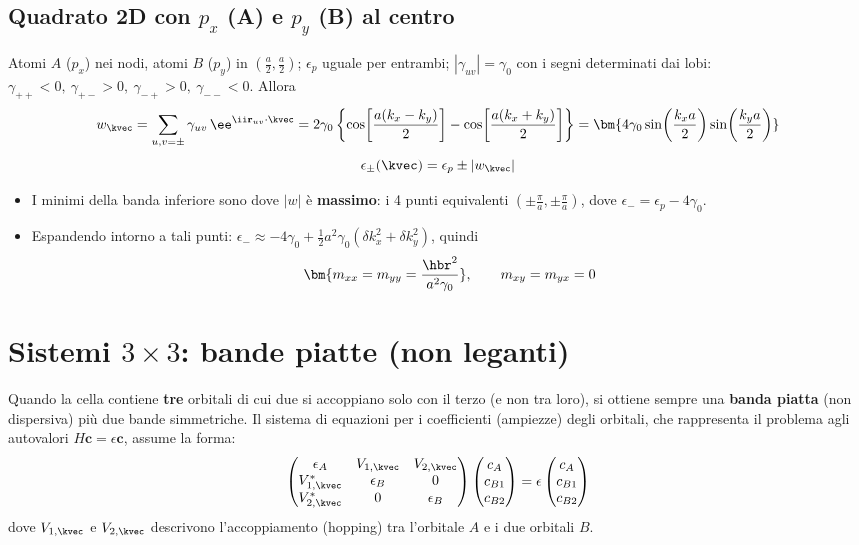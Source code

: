 \subsection{Quadrato 2D con $p_x$ (A) e $p_y$ (B) al centro}
Atomi $A$ ($p_x$) nei nodi, atomi $B$ ($p_y$) in $\left(\frac a2,\frac a2\right)$; $\epsilon_p$ uguale per entrambi; $|\gamma_{uv}|=\gamma_0$ con i segni determinati dai lobi: $\gamma_{++}<0,\ \gamma_{+-}>0,\ \gamma_{-+}>0,\ \gamma_{--}<0$. Allora
\[ w_\kvec = \sum_{u,v=\pm}\gamma_{uv}\,\ee^{\ii \mathbf{r}_{uv}\cdot\kvec}
  = 2\gamma_0\left\{\cos\!\left[\frac{a(k_x-k_y)}{2}\right]-\cos\!\left[\frac{a(k_x+k_y)}{2}\right]\right\}
  = \bm{4\gamma_0\sin\!\left(\frac{k_xa}{2}\right)\sin\!\left(\frac{k_ya}{2}\right)} \]
\[ \epsilon_\pm(\kvec) = \epsilon_p \pm |w_\kvec| \]
\begin{itemize}
  \item I minimi della banda inferiore sono dove $|w|$ è \textbf{massimo}: i 4 punti equivalenti $\left(\pm\frac\pi a,\pm\frac\pi a\right)$, dove $\epsilon_- = \epsilon_p-4\gamma_0$.
  \item Espandendo intorno a tali punti: $\epsilon_-\approx-4\gamma_0+\frac12a^2\gamma_0(\delta k_x^2+\delta k_y^2)$, quindi
  \[ \bm{m_{xx}=m_{yy}=\frac{\hbr^2}{a^2\gamma_0}}, \qquad m_{xy}=m_{yx}=0 \]
\end{itemize}

\section{Sistemi $3\times3$: bande piatte (non leganti)}
Quando la cella contiene \textbf{tre} orbitali di cui due si accoppiano solo con il terzo (e non tra loro), si ottiene sempre una \textbf{banda piatta} (non dispersiva) più due bande simmetriche.
Il sistema di equazioni per i coefficienti (ampiezze) degli orbitali, che rappresenta il problema agli autovalori $H\mathbf{c} = \epsilon\mathbf{c}$, assume la forma:
\[ 
\begin{pmatrix} 
\epsilon_A & V_{1,\kvec} & V_{2,\kvec} \\ 
V_{1,\kvec}^* & \epsilon_B & 0 \\ 
V_{2,\kvec}^* & 0 & \epsilon_B 
\end{pmatrix} 
\begin{pmatrix} 
c_A \\ c_{B1} \\ c_{B2} 
\end{pmatrix} 
= \epsilon 
\begin{pmatrix} 
c_A \\ c_{B1} \\ c_{B2} 
\end{pmatrix} 
\]
dove $V_{1,\kvec}$ e $V_{2,\kvec}$ descrivono l'accoppiamento (hopping) tra l'orbitale $A$ e i due orbitali $B$. 

